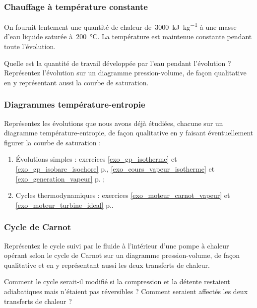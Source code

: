 \subsubsection{Chauffage à température constante}
\label{exo_chauffage_isotherme_eau}

	On fournit lentement une quantité de chaleur de~\SI{3000}{\kilo\joule\per\kilogram} à une masse d’eau liquide saturée à~\SI{200}{\degreeCelsius}. La température est maintenue constante pendant toute l’évolution.
	
	Quelle est la quantité de travail développée par l’eau pendant l’évolution ? Représentez l’évolution sur un diagramme pression-volume, de façon qualitative en y représentant aussi la courbe de saturation.


\subsubsection{Diagrammes température-entropie}
\label{exo_diagrammes_ts}

	Représentez les évolutions que nous avons déjà étudiées, chacune sur un diagramme température-entropie, de façon qualitative en y faisant éventuellement figurer la courbe de saturation :
	
	\begin{enumerate}
		\item Évolutions simples : exercices \ref{exo_gp_isotherme} et \ref{exo_gp_isobare_isochore} p.\pageref{exo_gp_isobare_isochore}, \ref{exo_cours_vapeur_isotherme} et \ref{exo_generation_vapeur} p.\pageref{exo_generation_vapeur} ;
		\item Cycles thermodynamiques : exercices \ref{exo_moteur_carnot_vapeur} et \ref{exo_moteur_turbine_ideal} p.\pageref{exo_moteur_turbine_ideal}.
	\end{enumerate}

	
\subsubsection{Cycle de Carnot}
\label{exo_ts_carnot}

	Représentez le cycle suivi par le fluide à l’intérieur d’une pompe à chaleur opérant selon le cycle de Carnot sur un diagramme pression-volume, de façon qualitative et en y représentant aussi les deux transferts de chaleur.
	
	Comment le cycle serait-il modifié si la compression et la détente restaient adiabatiques mais n’étaient pas réversibles ? Comment seraient affectés les deux transferts de chaleur ?

